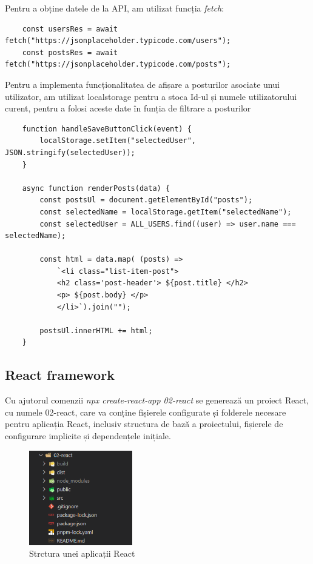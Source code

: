 \documentclass[12pt, a4paper]{report}
\begin{document}
Pentru a obține datele de la API, am utilizat funcția  \emph{fetch}:
\begin{lstlisting}
	const usersRes = await fetch("https://jsonplaceholder.typicode.com/users");
	const postsRes = await fetch("https://jsonplaceholder.typicode.com/posts");
\end{lstlisting}

Pentru a implementa funcționalitatea de afișare a posturilor asociate unui utilizator, am utilizat localstorage pentru a stoca Id-ul și numele utilizatorului curent, pentru a folosi aceste date în funția de filtrare a posturilor
\begin{lstlisting}
	function handleSaveButtonClick(event) {
		localStorage.setItem("selectedUser", JSON.stringify(selectedUser));
	}

	async function renderPosts(data) {
		const postsUl = document.getElementById("posts");
		const selectedName = localStorage.getItem("selectedName");
  		const selectedUser = ALL_USERS.find((user) => user.name === selectedName);

		const html = data.map( (posts) => 
			`<li class="list-item-post"> 
			<h2 class='post-header'> ${post.title} </h2>
			<p> ${post.body} </p>
			</li>`).join("");

	  	postsUl.innerHTML += html;
	}

\end{lstlisting}
\subsection{React framework}

Cu ajutorul comenzii \emph{npx create-react-app 02-react} se generează un proiect React, cu numele 02-react, care va conține fișierele configurate și folderele necesare pentru aplicația React, inclusiv structura de bază a proiectului, fișierele de configurare implicite și dependențele inițiale.

\begin{figure}[htbp]
	\centering
	\includegraphics[width=0.4\textwidth]{react_file_structure.png}
	\caption{Strctura unei aplicații React}
	\label{fig:react-structure}
\end{figure}
\end{document}
